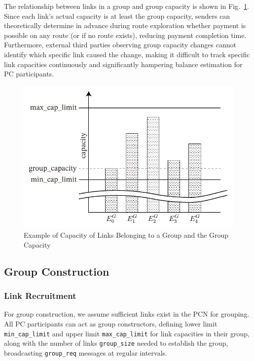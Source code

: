 \documentclass[conference]{IEEEtran}
\newcommand{\groupreq}{\texttt{group\_req}}
\newcommand{\groupsize}{\texttt{group\_size}}
\newcommand{\mincaplimit}{\texttt{min\_cap\_limit}}
\newcommand{\maxcaplimit}{\texttt{max\_cap\_limit}}
\begin{document}
The relationship between links in a group and group capacity is shown in Fig.~\ref{fig:capacities_in_group}. Since each link's actual capacity is at least the group capacity, senders can theoretically determine in advance during route exploration whether payment is possible on any route (or if no route exists), reducing payment completion time. Furthermore, external third parties observing group capacity changes cannot identify which specific link caused the change, making it difficult to track specific link capacities continuously and significantly hampering balance estimation for PC participants.

\begin{figure}[htbp]
	\centerline{\includegraphics[width=0.85\linewidth]{fig/capacities_in_group}}
	\caption{Example of Capacity of Links Belonging to a Group and the Group Capacity}
	\label{fig:capacities_in_group}
\end{figure}

\subsection{Group Construction}

\subsubsection{Link Recruitment}

For group construction, we assume sufficient links exist in the PCN for grouping. All PC participants can act as group constructors, defining lower limit \mincaplimit{} and upper limit \maxcaplimit{} for link capacities in their group, along with the number of links \groupsize{} needed to establish the group, broadcasting \groupreq{} messages at regular intervals.
\end{document}
